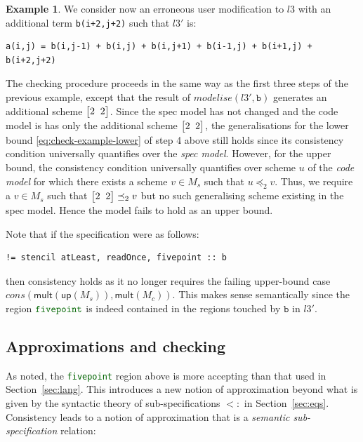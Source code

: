 \documentclass[9pt,preprint]{sigplanconf}
\newcounter{block}
\theoremstyle{definition}
\newtheorem{example}[block]{Example}
\newcommand{\term}[1]{\texttt{#1}}
\newcommand{\vtwoh}[2]{\setlength{\arraycolsep}{0em}
\left[\begin{array}{cc}#1 \; & \; #2\end{array}\right]}
\begin{document}
\begin{example} 
We consider now an erroneous user modification to $l3$ with an
additional term \texttt{b(i+2,j+2)} such that $l3'$ is:
%
\begin{verbatim}
a(i,j) = b(i,j-1) + b(i,j) + b(i,j+1) + b(i-1,j) + b(i+1,j) + b(i+2,j+2)
\end{verbatim}
%
The checking procedure proceeds in the same way as the first three
steps of the previous example, except that the result of
$\mathit{modelise}(l3',\texttt{b})$ generates an additional scheme
$\vtwoh{2}{2}$. Since the spec model has not changed and the code
model is has only the additional scheme $\vtwoh{2}{2}$, the generalisations for
the lower bound \eqref{eq:check-example-lower} 
of step 4 above still holds since its consistency condition
universally quantifies over the \emph{spec model}. However, for
the upper bound, the consistency condition universally quantifies
over scheme $u$ of the \emph{code model} for which there exists
a scheme $v \in M_s$ such that $u \preceq_2 v$. Thus, we require a $v
\in M_s$ such that $\vtwoh{2}{2} \preceq_2 v$ but no such generalising
scheme existing in the spec model. Hence the model fails to hold as an upper bound.

Note that if the specification were as follows:
%
\begin{verbatim}
!= stencil atLeast, readOnce, fivepoint :: b
\end{verbatim}
%
then consistency holds as it no longer requires the failing upper-bound case 
$\mathit{cons}(\textsf{mult}(\textsf{up}(M_s)),\textsf{mult}(M_c))$.
 This makes sense semantically since the region ${\textcolor{darkgreen}{\texttt{fivepoint}}}$
is indeed contained in the regions touched by $\texttt{b}$ in $l3'$. 
\end{example}

\subsection{Approximations and checking}

As noted, the {\textcolor{darkgreen}{\term{fivepoint}}} region
 above is more accepting than that used in
Section~\ref{sec:lang}. This introduces a new notion of approximation
beyond what is given by the syntactic theory of sub-specifications
$<:$ in Section~\ref{sec:eqs}. Consistency leads to a notion of
approximation that is a \textit{semantic sub-specification} relation:
\end{document}
